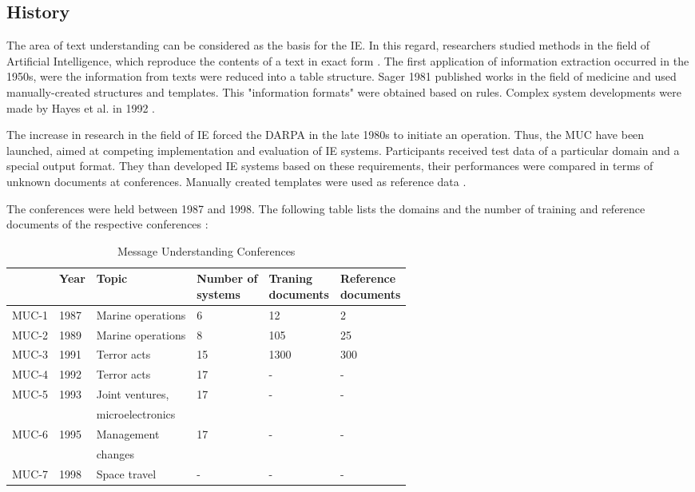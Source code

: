 \newpage
\subsection{History}
The area of text understanding can be considered as the basis for the \gls{IE}. In this regard, researchers studied methods in the field of Artificial Intelligence, which reproduce the contents of a text in exact form \cite{Siefkes:2007}\cite{Eikvil:1999}. The first application of information extraction occurred in the 1950s, were  the information from texts  were reduced into a table structure. Sager 1981 published works in the field of medicine and used manually-created structures and templates. This "information formats" were obtained based on rules. Complex system developments were made by Hayes et al. in 1992 \cite{Grishman:1997}\cite{Gaizauskas:1998}\cite{Wilks:1997}.

The increase in research in the field of IE forced the \gls{DARPA} in the late 1980s to initiate an operation. Thus, the \gls{MUC} have been launched, aimed at competing implementation and evaluation of IE systems. Participants received test data of a particular domain and a special output format. They than developed IE systems based on these requirements, their performances were compared in terms of unknown documents at conferences. Manually created templates were used as reference data \cite{Grishman:1996}\cite{Grishman:1997}.

The conferences were held between 1987 and 1998. The following table lists the domains and the number of training and reference documents of the respective conferences \cite{Turmo:2006}\cite{Appelt:1999}\cite{Cunningham:2005}:

\begin{table}[H]
\centering
\begin{tabular*}{\textwidth}{ l l l l l l }
	\toprule
	& Year & Topic & \shortstack{Number of \\ systems} & \shortstack{Traning \\ documents} & \shortstack{Reference \\ documents} \\
	\midrule
	MUC-1 & 1987 & Marine operations & 6 & 12 & 2 \\
	MUC-2 & 1989 & Marine operations & 8 & 105 & 25 \\
	MUC-3 & 1991 & Terror acts & 15 & 1300 & 300 \\
	MUC-4 & 1992 & Terror acts & 17 & - & - \\
	MUC-5 & 1993 & Joint ventures, & 17 & - & - \\
	& & microelectronics & & & \\
	MUC-6 & 1995 & Management & 17 & - & - \\
	& & changes & & & \\
	MUC-7 & 1998 & Space travel & - & - & - \\
	\bottomrule
\end{tabular*}
\caption{Message Understanding Conferences}
\end{table}

